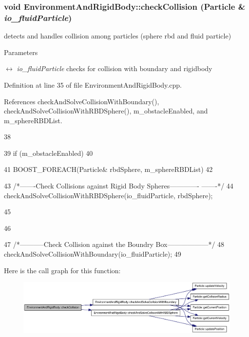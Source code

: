 \hypertarget{class_environment_and_rigid_body_a5f3b1304b9a7ba38c69367385340e2cb}{
\subsubsection[{checkCollision}]{\setlength{\rightskip}{0pt plus 5cm}void EnvironmentAndRigidBody::checkCollision ({\bf Particle} \& {\em io\_\-fluidParticle})}}
\label{class_environment_and_rigid_body_a5f3b1304b9a7ba38c69367385340e2cb}


detects and handles collision among particles (sphere rbd and fluid particle) 


\begin{DoxyParams}{Parameters}
\item[\mbox{$\leftrightarrow$} {\em io\_\-fluidParticle}]checks for collision with boundary and rigidbody \end{DoxyParams}


Definition at line 35 of file EnvironmentAndRigidBody.cpp.



References checkAndSolveCollisionWithBoundary(), checkAndSolveCollisionWithRBDSphere(), m\_\-obstacleEnabled, and m\_\-sphereRBDList.




\begin{DoxyCode}
38 {
39     if (m_obstacleEnabled)
40     {
41         BOOST_FOREACH(Particle& rbdSphere, m_sphereRBDList)
42         {
43                 /*-------Check Collisions against Rigid Body Spheres-------------
      -------*/
44                 checkAndSolveCollisionWithRBDSphere(io_fluidParticle, rbdSphere);
      
45         }
46      }
47     /*-----------Check Collision against the Boundry Box------------------*/
48     checkAndSolveCollisionWithBoundary(io_fluidParticle);
49 }
\end{DoxyCode}




Here is the call graph for this function:\nopagebreak
\begin{figure}[H]
\begin{center}
\leavevmode
\includegraphics[width=382pt]{class_environment_and_rigid_body_a5f3b1304b9a7ba38c69367385340e2cb_cgraph}
\end{center}
\end{figure}




